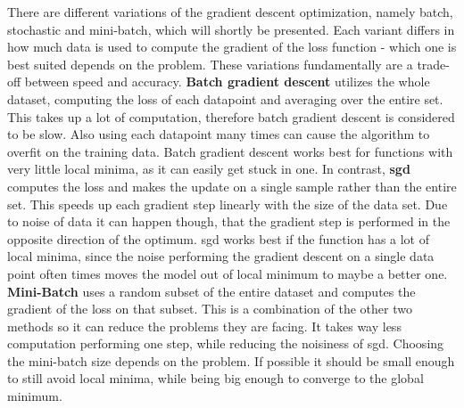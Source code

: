 There are different variations of the gradient descent optimization, namely batch, stochastic and mini-batch, which will shortly be presented. Each variant differs in how much data is used to compute the gradient of the loss function - which one is best suited depends on the problem. These variations fundamentally are a trade-off between speed and accuracy. \textbf{Batch gradient descent} utilizes the whole dataset, computing the loss of each datapoint and averaging over the entire set. This takes up a lot of computation, therefore batch gradient descent is considered to be slow. Also using each datapoint many times can cause the algorithm to overfit on the training data. Batch gradient descent works best for functions with very little local minima, as it can easily get stuck in one. In contrast, \textbf{\gls{sgd}} computes the loss and makes the update on a single sample rather than the entire set. This speeds up each gradient step linearly with the size of the data set. Due to noise of data it can happen though, that the gradient step is performed in the opposite direction of the optimum. \gls{sgd} works best if the function has a lot of local minima, since the noise performing the gradient descent on a single data point often times moves the model out of local minimum to maybe a better one. \textbf{Mini-Batch} uses a random subset of the entire dataset and computes the gradient of the loss on that subset. This is a combination of the other two methods so it can reduce the problems they are facing. It takes way less computation performing one step, while reducing the noisiness of \gls{sgd}. Choosing the mini-batch size depends on the problem. If possible it should be small enough to still avoid local minima, while being big enough to converge to the global minimum.

